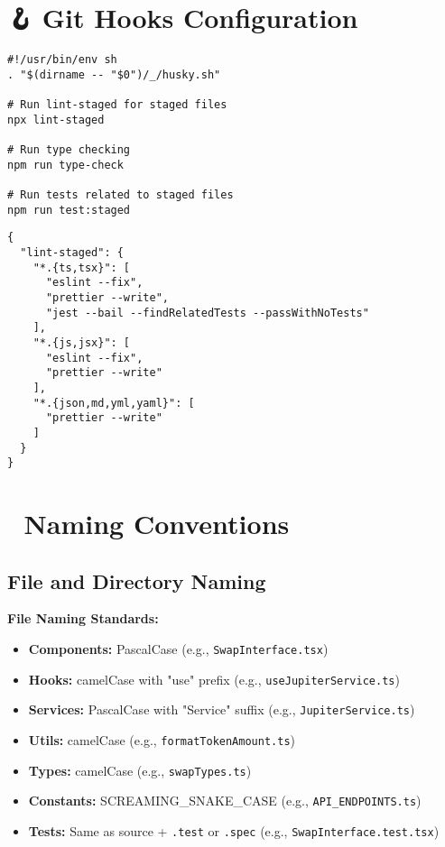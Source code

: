 \documentclass[11pt,a4paper]{article}
\begin{document}
\section{🪝 Git Hooks Configuration}

\begin{lstlisting}[style=typescript, caption=Husky Pre-commit Configuration]
#!/usr/bin/env sh
. "$(dirname -- "$0")/_/husky.sh"

# Run lint-staged for staged files
npx lint-staged

# Run type checking
npm run type-check

# Run tests related to staged files
npm run test:staged
\end{lstlisting}

\begin{lstlisting}[style=typescript, caption=Lint-staged Configuration (package.json)]
{
  "lint-staged": {
    "*.{ts,tsx}": [
      "eslint --fix",
      "prettier --write",
      "jest --bail --findRelatedTests --passWithNoTests"
    ],
    "*.{js,jsx}": [
      "eslint --fix",
      "prettier --write"
    ],
    "*.{json,md,yml,yaml}": [
      "prettier --write"
    ]
  }
}
\end{lstlisting}

\section{📝 Naming Conventions}

\subsection{File and Directory Naming}

\begin{tcolorbox}[colback=jupiterBlue!10,colframe=jupiterBlue]
\textbf{File Naming Standards:}
\begin{itemize}
    \item \textbf{Components:} PascalCase (e.g., \texttt{SwapInterface.tsx})
    \item \textbf{Hooks:} camelCase with "use" prefix (e.g., \texttt{useJupiterService.ts})
    \item \textbf{Services:} PascalCase with "Service" suffix (e.g., \texttt{JupiterService.ts})
    \item \textbf{Utils:} camelCase (e.g., \texttt{formatTokenAmount.ts})
    \item \textbf{Types:} camelCase (e.g., \texttt{swapTypes.ts})
    \item \textbf{Constants:} SCREAMING\_SNAKE\_CASE (e.g., \texttt{API\_ENDPOINTS.ts})
    \item \textbf{Tests:} Same as source + \texttt{.test} or \texttt{.spec} (e.g., \texttt{SwapInterface.test.tsx})
\end{itemize}
\end{tcolorbox}
\end{document}
